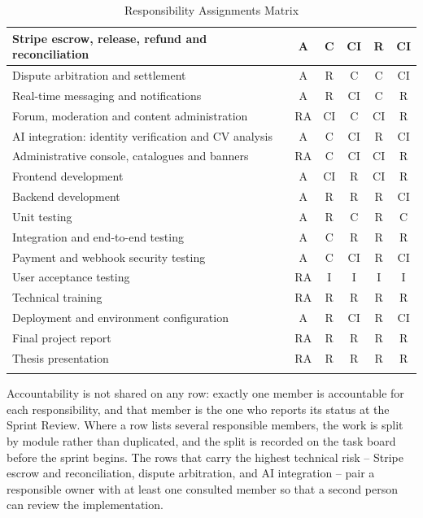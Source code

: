 \begin{longtable}{|p{5.6cm}|c|c|c|c|c|}
Stripe escrow, release, refund and reconciliation
& A & C & CI & R & CI \\ \hline

Dispute arbitration and settlement
& A & R & C & C & CI \\ \hline

Real-time messaging and notifications
& A & R & CI & C & R \\ \hline

Forum, moderation and content administration
& RA & CI & C & CI & R \\ \hline

AI integration: identity verification and CV analysis
& A & C & CI & R & CI \\ \hline

Administrative console, catalogues and banners
& RA & C & CI & CI & R \\ \hline

Frontend development
& A & CI & R & CI & R \\ \hline

Backend development
& A & R & R & R & CI \\ \hline

Unit testing
& A & R & C & R & C \\ \hline

Integration and end-to-end testing
& A & C & R & R & R \\ \hline

Payment and webhook security testing
& A & C & CI & R & CI \\ \hline

User acceptance testing
& RA & I & I & I & I \\ \hline

Technical training
& RA & R & R & R & R \\ \hline

Deployment and environment configuration
& A & R & CI & R & CI \\ \hline

Final project report
& RA & R & R & R & R \\ \hline

Thesis presentation
& RA & R & R & R & R \\ \hline

\caption{Responsibility Assignments Matrix}
\label{tab:raci}
\end{longtable}

\normalsize

Accountability is not shared on any row: exactly one member is accountable for each responsibility, and that member is the one who reports its status at the Sprint Review. Where a row lists several responsible members, the work is split by module rather than duplicated, and the split is recorded on the task board before the sprint begins. The rows that carry the highest technical risk -- Stripe escrow and reconciliation, dispute arbitration, and AI integration -- pair a responsible owner with at least one consulted member so that a second person can review the implementation.
